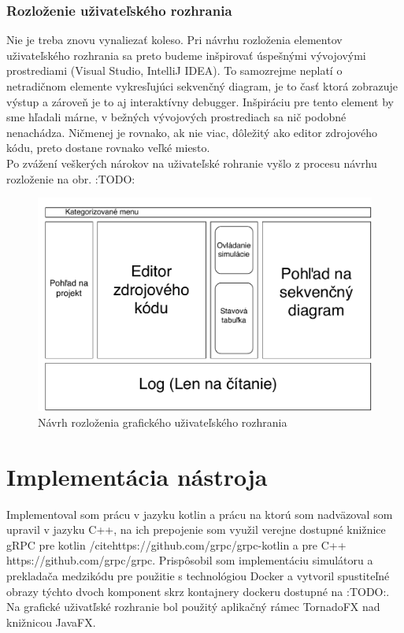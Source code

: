 \subsection{Rozloženie uživateľského rozhrania}

Nie je treba znovu vynaliezať koleso. Pri návrhu rozloženia elementov uživateľského rozhrania sa preto budeme inšpirovať úspešnými vývojovými prostrediami (Visual Studio, IntelliJ IDEA).
To samozrejme neplatí o netradičnom elemente vykresľujúci sekvenčný diagram, je to časť ktorá zobrazuje výstup a zároveň je to aj interaktívny debugger. Inšpiráciu pre tento element by sme hľadali márne, v bežných vývojových prostrediach sa nič podobné nenachádza.
Ničmenej je rovnako, ak nie viac, dôležitý ako editor zdrojového kódu, preto dostane rovnako veľké miesto. \\

Po zvážení veškerých nárokov na uživateľské rohranie vyšlo z procesu návrhu rozloženie na obr. :TODO:

\begin{figure}[H]
	\label{fig:ui-layout}
	\centering
	\includegraphics[scale=0.75]{obrazky-figures/UI-layout}
	\caption{Návrh rozloženia grafického uživateľského rozhrania}
\end{figure}



\chapter{Implementácia nástroja}

Implementoval som prácu v jazyku kotlin a prácu na ktorú som nadväzoval som upravil v jazyku C++, na ich prepojenie som využil verejne dostupné knižnice gRPC pre kotlin /cite{}https://github.com/grpc/grpc-kotlin a pre C++ \cite{}https://github.com/grpc/grpc. Prispôsobil som implementáciu simulátoru a prekladača medzikódu pre použitie s technológiou Docker a vytvoril spustiteľné obrazy týchto dvoch komponent skrz kontajnery dockeru dostupné na :TODO:. Na grafické uživatľské rozhranie bol použitý aplikačný rámec TornadoFX nad knižnicou JavaFX.

